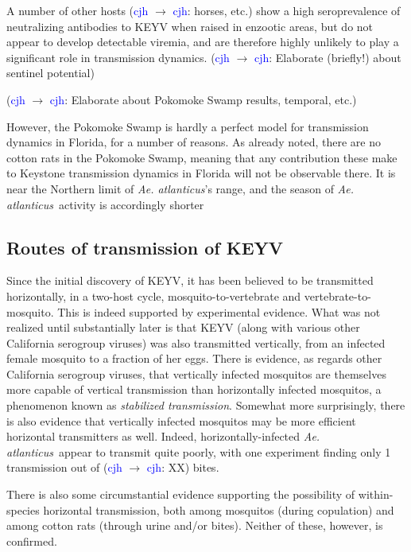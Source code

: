 \documentclass[12pt]{article}
\newcommand{\atl}{\textit{Ae. atlanticus}}
\newcommand{\cjh}{\textcolor{blue}{cjh}}
\newcommand{\msg}[3]{(#1 $\rightarrow$ #2: #3)}
\newcommand{\mcc}[1]{\msg\cjh\cjh{#1}}
\begin{document}
            A number of other hosts \mcc{horses, etc.} show a high seroprevalence of neutralizing antibodies to KEYV when raised in enzootic areas, but do not appear to develop detectable viremia, and are therefore highly unlikely to play a significant role in transmission dynamics. \mcc{Elaborate (briefly!) about sentinel potential}

            \mcc{Elaborate about Pokomoke Swamp results, temporal, etc.}
            
            However, the Pokomoke Swamp is hardly a perfect model for transmission dynamics in Florida, for a number of reasons. As already noted, there are no cotton rats in the Pokomoke Swamp, meaning that any contribution these make to Keystone transmission dynamics in Florida will not be observable there. It is near the Northern limit of \textit{Ae. atlanticus}'s range, and the season of \atl\ activity is accordingly shorter

        \subsection{Routes of transmission of KEYV}
            Since the initial discovery of KEYV, it has been believed to be transmitted horizontally, in a two-host cycle, mosquito-to-vertebrate and vertebrate-to-mosquito. This is indeed supported by experimental evidence. What was not realized until substantially later is that KEYV (along with various other California serogroup viruses) was also transmitted vertically, from an infected female mosquito to a fraction of her eggs. There is evidence, as regards other California serogroup viruses, that vertically infected mosquitos are themselves more capable of vertical transmission than horizontally infected mosquitos, a phenomenon known as \textit{stabilized transmission}. Somewhat more surprisingly, there is also evidence that vertically infected mosquitos may be more efficient horizontal transmitters as well. Indeed, horizontally-infected \atl\ appear to transmit quite poorly, with one experiment finding only 1 transmission out of \mcc{XX} bites.

            There is also some circumstantial evidence supporting the possibility of within-species horizontal transmission, both among mosquitos (during copulation) and among cotton rats (through urine and/or bites). Neither of these, however, is confirmed.
\end{document}
